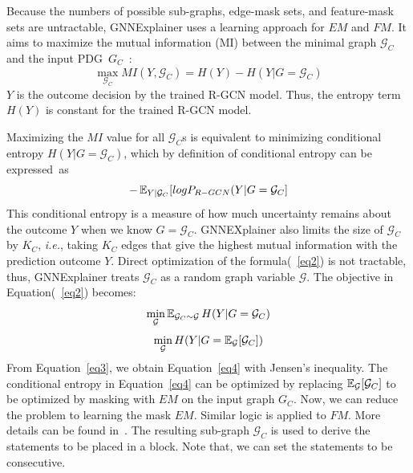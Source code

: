 
Because the numbers of possible sub-graphs, edge-mask sets, and
feature-mask sets are untractable, GNNExplainer uses a learning
approach for $EM$ and $FM$. It aims to maximize the mutual information
(MI) between the minimal graph $\mathcal{G}_C$ and the input
PDG~$G_C$~\cite{GNNExplainer}:
\begin{equation}\label{maineq}
\max_{\mathcal{G}_C} MI(Y,\mathcal{G}_C) = H(Y) - H(Y|G=\mathcal{G}_C)
\end{equation}
$Y$ is the outcome decision by the trained R-GCN model. Thus, the
entropy term $H(Y)$ is constant for the trained R-GCN
model.

Maximizing the $MI$ value for all $\mathcal{G}_C$s is equivalent
to minimizing conditional entropy $H(Y|G=\mathcal{G}_C)$, which by
definition of conditional entropy can be expressed~as
\begin{equation}
  \label{eq2}
-\operatorname{\mathbb{E}}_{Y|\mathcal{G}_C}
  [log P_{R-GCN} (Y|G=\mathcal{G}_C]
\end{equation}
This conditional entropy is a measure of how
much uncertainty remains about the outcome $Y$ when we know
$G=\mathcal{G}_C$. GNNEXplainer also limits the size of
$\mathcal{G}_C$ by $K_C$, {\em i.e.}, taking $K_C$ edges that give the
highest mutual information with the prediction outcome $Y$.
%
Direct optimization of the formula(~\ref{eq2}) is not tractable, thus,
GNNExplainer treats $\mathcal{G}_C$ as a random graph variable
$\mathcal{G}$. The objective in Equation(~\ref{eq2}) becomes:
\begin{equation}
  \label{eq3}
  \min_{\mathcal{G}} \operatorname{\mathbb{E}}_{\mathcal{G}_C \sim \mathcal{G}} H(Y|G=\mathcal{G}_C)
\end{equation}
\begin{equation}
  \label{eq4}
  \min_{\mathcal{G}} H(Y| G=\operatorname{\mathbb{E}}_{\mathcal{G}}[\mathcal{G}_C])
\end{equation}
From Equation~\ref{eq3}, we obtain Equation~\ref{eq4} with Jensen's
inequality.  The conditional entropy in Equation~\ref{eq4} can be
optimized by replacing $\operatorname{\mathbb{E}}_{\mathcal{G}}[\mathcal{G}_C]$ to be
optimized by masking with $EM$ on the input graph $G_C$.  Now, we can
reduce the problem to learning the mask $EM$.  Similar logic is
applied to $FM$. More details can be found
in~\cite{GNNExplainer}. The resulting sub-graph $\mathcal{G}_C$ is
used to derive the statements to be placed in a 
block. Note that, we can set the statements to be consecutive.

